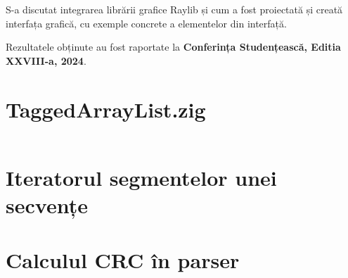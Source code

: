 \documentclass[a4paper,12pt]{report}
\newcommand{\conferencesList}{Conferința Studențească, Editia XXVIII-a, 2024}
\begin{document}
S-a discutat integrarea librării grafice Raylib și cum a fost proiectată și creată interfața grafică,
cu exemple concrete a elementelor din interfață.



Rezultatele obținute au fost raportate la \textbf{\conferencesList}.

\newpage
{}





\appendix

\renewcommand{\thesection}{\arabic{section}}
\titleformat{\section}[block]{\normalfont\normalsize\bfseries\filcenter}{Anexa \thesection~}{0pt}{}


\setcounter{chapter}{1}



\section{TaggedArrayList.zig}\label{appendix:main__TaggedArrayList}
\inputminted{zig}{../src/TaggedArrayList.zig}

\section{Iteratorul segmentelor unei secvențe}\label{appendix:sequence_iterator}

\section{Calculul CRC în parser}\label{appendix:crc_sequence_defer_example}
\end{document}

